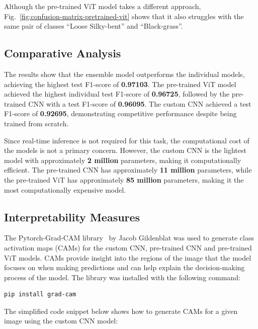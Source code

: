 Although the pre-trained ViT model takes a different approach, Fig.~\ref{fig:confusion-matrix-pretrained-vit} shows that it also struggles with the same pair of classes ``Loose Silky-bent'' and ``Black-grass''.

\subsection{Comparative Analysis}

The results show that the ensemble model outperforms the individual models, achieving the highest test F1-score of \textbf{0.97103}. The pre-trained ViT model achieved the highest individual test F1-score of \textbf{0.96725}, followed by the pre-trained CNN with a test F1-score of \textbf{0.96095}. The custom CNN achieved a test F1-score of \textbf{0.92695}, demonstrating competitive performance despite being trained from scratch.

Since real-time inference is not required for this task, the computational cost of the models is not a primary concern. However, the custom CNN is the lightest model with approximately \textbf{2 million} parameters, making it computationally efficient. The pre-trained CNN has approximately \textbf{11 million} parameters, while the pre-trained ViT has approximately \textbf{85 million} parameters, making it the most computationally expensive model.

\subsection{Interpretability Measures}

The Pytorch-Grad-CAM library~\cite{jacobgilpytorchcam} by Jacob Gildenblat was used to generate class activation maps (CAMs) for the custom CNN, pre-trained CNN and pre-trained ViT models. CAMs provide insight into the regions of the image that the model focuses on when making predictions and can help explain the decision-making process of the model. The library was installed with the following command:

\begin{minipage}{0.9\linewidth}\begin{lstlisting}[language={},caption={Install Pytorch-Grad-CAM library.},label={lst:install-grad-cam}]
pip install grad-cam
\end{lstlisting}\end{minipage}

The simplified code snippet below shows how to generate CAMs for a given image using the custom CNN model:

